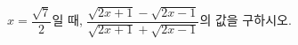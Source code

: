 \hspace*{2mm}\begin{minipage}[t]{\dimexpr\linewidth-2mm\relax}\vspace{0pt}
$x=\dfrac{\sqrt{7}}{2}$일 때, $\dfrac{\sqrt{2x+1}-\sqrt{2x-1}}{\sqrt{2x+1}+\sqrt{2x-1}}$의 값을 구하시오.\end{minipage}

